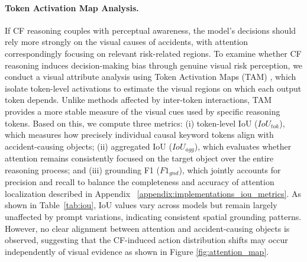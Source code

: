 \documentclass{article}
\begin{document}
\paragraph{Token Activation Map Analysis.} If CF reasoning couples with perceptual awareness, the model’s decisions should rely more strongly on the visual causes of accidents, with attention correspondingly focusing on relevant risk-related regions. To examine whether CF reasoning induces decision-making bias through genuine visual risk perception, we conduct a visual attribute analysis using Token Activation Maps (TAM) \cite{attention:tam}, which isolate token-level activations to estimate the visual regions on which each output token depends. Unlike methods affected by inter-token interactions, TAM provides a more stable measure of the visual cues used by specific reasoning tokens. Based on this, we compute three metrics: (i) token-level IoU ($IoU_{tok}$), which measures how precisely individual causal keyword tokens align with accident-causing objects; (ii) aggregated IoU ($IoU_{agg}$), which evaluates whether attention remains consistently focused on the target object over the entire reasoning process; and (iii) grounding F1 ($F1_{gnd}$), which jointly accounts for precision and recall to balance the completeness and accuracy of attention localization described in Appendix ~\ref{appendix:implementations_iou_metrics}. As shown in Table~\ref{tab:iou}, IoU values vary across models but remain largely unaffected by prompt variations, indicating consistent spatial grounding patterns. However, no clear alignment between attention and accident-causing objects is observed, suggesting that the CF-induced action distribution shifts may occur independently of visual evidence as shown in Figure \ref{fig:attention_map}.
\end{document}
